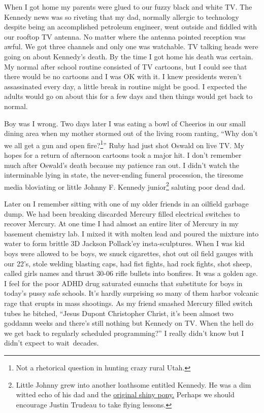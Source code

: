 When I got home my parents were glued to our fuzzy black and white TV.
The Kennedy news was so riveting that my dad, normally allergic to
technology despite being an accomplished petroleum engineer, went
outside and fiddled with our rooftop TV antenna. No matter where the
antenna pointed reception was awful. We got three channels and only one
was watchable. TV talking heads were going on about Kennedy's death. By
the time I got home his death was certain. My normal after school
routine consisted of TV cartoons, but I could see that there would be no
cartoons and I was OK with it. I knew presidents weren't assassinated
every day, a little break in routine might be good. I expected the
adults would go on about this for a few days and then things would get
back to normal.

Boy was I wrong. Two days later I was eating a bowl of Cheerios in our
small dining area when my mother stormed out of the living room ranting,
``Why don't we all get a gun and open
fire?\footnote{
Not a rhetorical question in hunting crazy rural Utah.
}'' Ruby had just shot Oswald on
live TV. My hopes for a return of afternoon cartoons took a major hit. I
don't remember much after Oswald's death because my patience ran out. I
didn't watch the interminable lying in state, the never-ending funeral
procession, the tiresome media bloviating or little Johnny F. Kennedy
junior\footnote{
Little Johnny grew into another loathsome entitled Kennedy. He was a
 dim witted echo of his dad and the
 \href{https://www.youtube.com/watch?v=HAkrbNEOrOY}{original shiny
 pony.} Perhaps we should encourage Justin Trudeau to take flying lessons.
} saluting poor dead dad.

Later on I remember sitting with one of my older friends in an oilfield
garbage dump. We had been breaking discarded Mercury filled electrical
switches to recover Mercury. At one time I had almost an entire liter of
Mercury in my basement chemistry lab. I mixed it with molten lead and
poured the mixture into water to form brittle 3D Jackson Pollack'ey
insta-sculptures. When I was kid boys were allowed to be boys, we snuck
cigarettes, shot out oil field gauges with our 22's, stole welding
blasting caps, had fist fights, had rock fights, shot sheep, called
girls names and thrust 30-06 rifle bullets into bonfires. It was a
golden age. I feel for the poor ADHD drug saturated eunuchs that
substitute for boys in today's pussy safe schools. It's hardly
surprising so many of them harbor volcanic rage that erupts in mass
shootings. As my friend smashed Mercury filled switch tubes he bitched,
``Jesus Dupont Christopher Christ, it's been almost two goddamn weeks
and there's still nothing but Kennedy on TV. When the hell do we get
back to regularly scheduled programming?'' I really didn't know but I
didn't expect to wait~decades.

